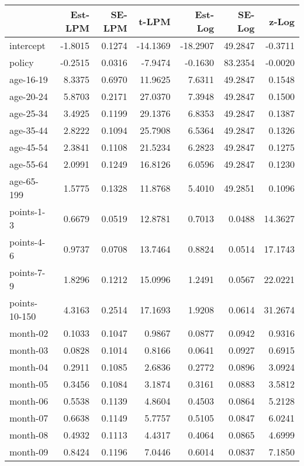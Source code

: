 \documentclass[10pt]{article}
\begin{document}
\begin{table}[ht]
\centering
\begin{tabular}{lrrrrrr}
  \hline
 & Est-LPM & SE-LPM & t-LPM & Est-Log & SE-Log & z-Log \\ 
  \hline
intercept & -1.8015 & 0.1274 & -14.1369 & -18.2907 & 49.2847 & -0.3711 \\ 
  policy & -0.2515 & 0.0316 & -7.9474 & -0.1630 & 83.2354 & -0.0020 \\ 
  age-16-19 & 8.3375 & 0.6970 & 11.9625 & 7.6311 & 49.2847 & 0.1548 \\ 
  age-20-24 & 5.8703 & 0.2171 & 27.0370 & 7.3948 & 49.2847 & 0.1500 \\ 
  age-25-34 & 3.4925 & 0.1199 & 29.1376 & 6.8353 & 49.2847 & 0.1387 \\ 
  age-35-44 & 2.8222 & 0.1094 & 25.7908 & 6.5364 & 49.2847 & 0.1326 \\ 
  age-45-54 & 2.3841 & 0.1108 & 21.5234 & 6.2823 & 49.2847 & 0.1275 \\ 
  age-55-64 & 2.0991 & 0.1249 & 16.8126 & 6.0596 & 49.2847 & 0.1230 \\ 
  age-65-199 & 1.5775 & 0.1328 & 11.8768 & 5.4010 & 49.2851 & 0.1096 \\ 
  points-1-3 & 0.6679 & 0.0519 & 12.8781 & 0.7013 & 0.0488 & 14.3627 \\ 
  points-4-6 & 0.9737 & 0.0708 & 13.7464 & 0.8824 & 0.0514 & 17.1743 \\ 
  points-7-9 & 1.8296 & 0.1212 & 15.0996 & 1.2491 & 0.0567 & 22.0221 \\ 
  points-10-150 & 4.3163 & 0.2514 & 17.1693 & 1.9208 & 0.0614 & 31.2674 \\ 
  month-02 & 0.1033 & 0.1047 & 0.9867 & 0.0877 & 0.0942 & 0.9316 \\ 
  month-03 & 0.0828 & 0.1014 & 0.8166 & 0.0641 & 0.0927 & 0.6915 \\ 
  month-04 & 0.2911 & 0.1085 & 2.6836 & 0.2772 & 0.0896 & 3.0924 \\ 
  month-05 & 0.3456 & 0.1084 & 3.1874 & 0.3161 & 0.0883 & 3.5812 \\ 
  month-06 & 0.5538 & 0.1139 & 4.8604 & 0.4503 & 0.0864 & 5.2128 \\ 
  month-07 & 0.6638 & 0.1149 & 5.7757 & 0.5105 & 0.0847 & 6.0241 \\ 
  month-08 & 0.4932 & 0.1113 & 4.4317 & 0.4064 & 0.0865 & 4.6999 \\ 
  month-09 & 0.8424 & 0.1196 & 7.0446 & 0.6014 & 0.0837 & 7.1850 \\ 

\end{tabular}
\end{table}
\end{document}
